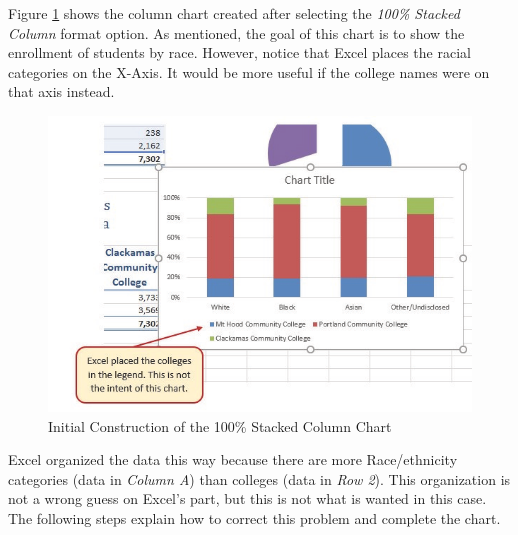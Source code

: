 Figure \ref{04:fig25} shows the column chart created after selecting the \textit{100\% Stacked Column} format option. As mentioned, the goal of this chart is to show the enrollment of students by race. However, notice that Excel places the racial categories on the X-Axis. It would be more useful if the college names were on that axis instead.

\begin{figure}[H]
	\centering
	\includegraphics[width=\maxwidth{.95\linewidth}]{gfx/ch04_fig25}
	\caption{Initial Construction of the 100\% Stacked Column Chart}
	\label{04:fig25}
\end{figure}

Excel organized the data this way because there are more Race/ethnicity categories (data in \textit{Column A}) than colleges (data in \textit{Row 2}). This organization is not a wrong guess on Excel's part, but this is not what is wanted in this case. The following steps explain how to correct this problem and complete the chart.

